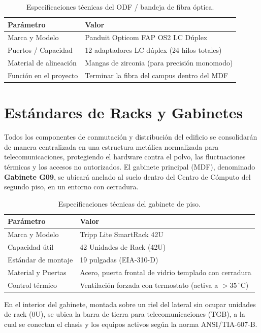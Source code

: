 \begin{table}[H]
\centering
\caption{Especificaciones técnicas del ODF / bandeja de fibra óptica.}
\label{tab:spec_odf}
\begin{tabular}{lp{9cm}}
\hline
\textbf{Parámetro} & \textbf{Valor} \\
\hline
Marca y Modelo & Panduit Opticom FAP OS2 LC Dúplex \\
Puertos / Capacidad & 12 adaptadores LC dúplex (24 hilos totales) \\
Material de alineación & Mangas de zirconia (para precisión monomodo) \\
Función en el proyecto & Terminar la fibra del campus dentro del MDF \\
\hline
\end{tabular}
\end{table}

\section{Estándares de Racks y Gabinetes}
Todos los componentes de conmutación y distribución del edificio se consolidarán de manera centralizada en una estructura metálica normalizada para telecomunicaciones, protegiendo el hardware contra el polvo, las fluctuaciones térmicas y los accesos no autorizados.
El gabinete principal (MDF), denominado \textbf{Gabinete G09}, se ubicará anclado al suelo dentro del Centro de Cómputo del segundo piso, en un entorno con cerradura.

\begin{table}[H]
\centering
\caption{Especificaciones técnicas del gabinete de piso.}
\label{tab:spec_gabinete}
\begin{tabular}{lp{9cm}}
\hline
\textbf{Parámetro} & \textbf{Valor} \\
\hline
Marca y Modelo & Tripp Lite SmartRack 42U \\
Capacidad útil & 42 Unidades de Rack (42U) \\
Estándar de montaje & 19 pulgadas (EIA-310-D) \\
Material y Puertas & Acero, puerta frontal de vidrio templado con cerradura \\
Control térmico & Ventilación forzada con termostato (activa a $>$35\,$^\circ$C) \\
\hline
\end{tabular}
\end{table}

\noindent En el interior del gabinete, montada sobre un riel del lateral sin ocupar unidades de rack (0U), se ubica la barra de tierra para telecomunicaciones (TGB), a la cual se conectan el chasis y los equipos activos según la norma ANSI/TIA-607-B.

